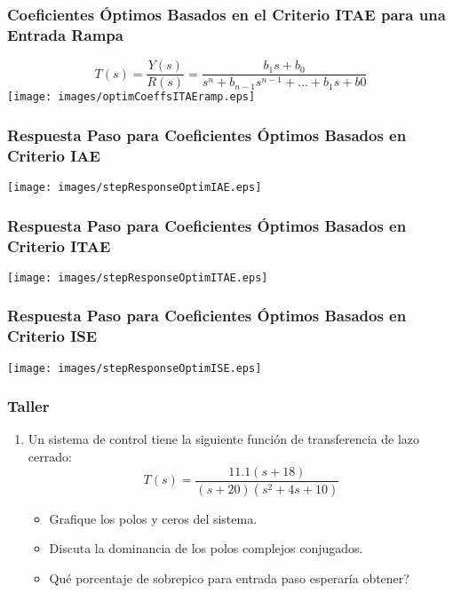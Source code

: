 \documentclass[aspectratio=169,handout]{beamer}
\theoremstyle{definition}
\theoremstyle{plain}
\theoremstyle{remark}
\newcounter{saveenumi}
\newcommand{\seti}{\setcounter{saveenumi}{\value{enumi}}}
\begin{document}
\begin{frame}[<+->]\frametitle{Coeficientes Óptimos Basados en el Criterio ITAE para una Entrada Rampa}
\centering
\begin{equation*}
	T(s) = \frac{Y(s)}{R(s)} = \frac{b_1s + b_0}{s^n + b_{n-1} s^{n-1} + \dots + b_1 s + b0}
\end{equation*}
\vspace*{10mm}
\texttt{[image: images/optimCoeffsITAEramp.eps]} 
\end{frame}

\begin{frame}[c]\frametitle{Respuesta Paso para Coeficientes Óptimos Basados en Criterio IAE}
\vspace*{5mm}
\centering
\texttt{[image: images/stepResponseOptimIAE.eps]}
\end{frame}

\begin{frame}[c]\frametitle{Respuesta Paso para Coeficientes Óptimos Basados en Criterio ITAE}
\vspace*{5mm}
\centering
\texttt{[image: images/stepResponseOptimITAE.eps]}
\end{frame}

\begin{frame}[c]\frametitle{Respuesta Paso para Coeficientes Óptimos Basados en Criterio ISE}
\vspace*{5mm}
\centering
\texttt{[image: images/stepResponseOptimISE.eps]}
\end{frame}

\begin{frame}[c]\frametitle{Taller}
	\begin{enumerate}
		\item Un sistema de control tiene la siguiente función de transferencia de lazo cerrado:
		\begin{equation*}
			T(s) = \frac{11.1 (s + 18)}{(s+20)(s^2 + 4s +10)}
		\end{equation*}
		\begin{itemize}
			\item Grafique los polos y ceros del sistema.
			\item Discuta la dominancia de los polos complejos conjugados.
			\item Qué porcentaje de sobrepico para entrada paso esperaría obtener?
		\end{itemize}
		\seti
	\end{enumerate}
\end{frame}
\end{document}
